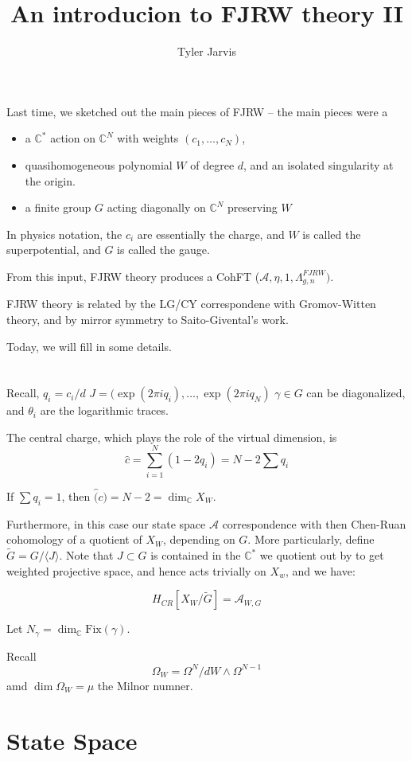 \documentclass{amsart}
\title{An introducion to FJRW theory II}
\author{Tyler Jarvis}
\theoremstyle{definition}
\newcommand{\C}{\mathbb{C}}
\newcommand{\Fix}{\text{Fix}}
\newcommand{\one}{1}
\begin{document}
\maketitle

Last time, we sketched out the main pieces of FJRW -- the main pieces were a 
\begin{itemize}
\item a $\C^*$ action on $\C^N$ with weights $(c_1,\dots, c_N)$, 
\item  quasihomogeneous polynomial $W$ of degree $d$, and an isolated singularity at the origin.
\item a finite group $G$ acting diagonally on $\C^N$ preserving $W$
\end{itemize}

In physics notation, the $c_i$ are essentially the charge, and $W$ is called the superpotential, and $G$ is called the gauge.

From this input, FJRW theory produces a CohFT ($\mathcal{A},\eta,\one,\Lambda^{FJRW}_{g,n})$.

FJRW theory is related by the LG/CY correspondene with Gromov-Witten theory, and by mirror symmetry to Saito-Givental's work.

Today, we will fill in some details.
\section{}
Recall, $q_i=c_i/d$
$J=(\exp(2\pi i q_i), \dots, \exp(2\pi i q_N)$
$\gamma\in G$ can be diagonalized, and $\theta_i$ are the logarithmic traces.

The central charge, which plays the role of the virtual dimension, is
$$\hat{c}=\sum_{i=1}^N(1-2q_i)=N-2\sum q_i$$

If $\sum q_i=1$, then $\hat(c)=N-2=\dim_\C X_W$.  

Furthermore, in this case our state space $\mathcal{A}$ correspondence with then Chen-Ruan cohomology of a quotient of $X_W$, depending on $G$.  More particularly, define $\tilde{G}=G/\langle J\rangle$.  Note that $J\subset G$ is contained in the $\C^*$ we quotient out by to get weighted projective space, and hence acts trivially on $X_w$, and we have:

$$H_{CR}[X_W/\tilde{G}]=\mathcal{A}_{W,G}$$

Let $N_\gamma=\dim_\C \Fix(\gamma)$.  

Recall $$\Omega_W=\Omega^N/dW\wedge\Omega^{N-1}$$
amd $\dim \Omega_W=\mu$ the Milnor numner.


\section{State Space}
\end{document}
